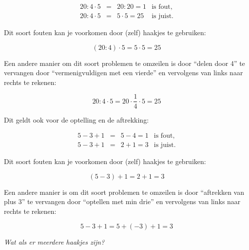 \begin{voorbeeld}

\begin{equation*}
\begin{array}{ccrl}
20 : 4 \cdot 5 &=& 20:20 =1 & \text{is fout,} \\
20 : 4 \cdot 5 &=& 5 \cdot 5 =25 & \text{is juist.}
\end{array}
\end{equation*}
	
Dit soort fouten kan je voorkomen door (zelf) haakjes te gebruiken:

\begin{equation*}
(20 : 4) \cdot 5 = 5 \cdot 5 = 25
\end{equation*}

Een andere manier om dit soort problemen te omzeilen is door “delen door 4” te vervangen door “vermenigvuldigen met een vierde” en vervolgens van links naar rechts te rekenen:

\begin{equation*}
20 : 4 \cdot 5 = 20 \cdot \frac{1}{4} \cdot 5 = 25
\end{equation*}

Dit geldt ook voor de optelling en de aftrekking:

\begin{equation*}
\begin{array}{ccrl}
5-3+1 &=& 5-4 =1 & \text{is fout,} \\
5-3+1 &=& 2+1=3 & \text{is juist.}
\end{array}
\end{equation*}

Dit soort fouten kan je voorkomen door (zelf) haakjes te gebruiken:

\begin{equation*}
(5-3)+1 = 2+1=3 
\end{equation*}

Een andere manier is om dit soort problemen te omzeilen is door “aftrekken van plus 3” te vervangen door “optellen met min drie” en vervolgens van links naar rechts te rekenen:

\begin{equation*}
5-3+1 = 5+(-3)+1=3 
\end{equation*}

\end{voorbeeld}

\emph{Wat als er meerdere haakjes zijn?}

